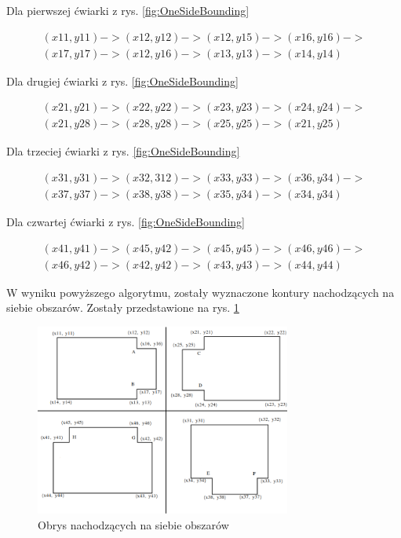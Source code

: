 Dla pierwszej ćwiarki z rys. \ref{fig:OneSideBounding}

\begin{equation}
\begin{split}
(x11, y11) -> (x12, y12) -> (x12, y15) -> (x16, y16) ->  \\
(x17, y17) -> (x12, y16) -> (x13, y13) -> (x14, y14)
\end{split}
\end{equation}

Dla drugiej ćwiarki z rys. \ref{fig:OneSideBounding}

\begin{equation}
\begin{split}
(x21, y21) -> (x22, y22) -> (x23, y23) -> (x24, y24) ->  \\
(x21, y28) -> (x28, y28) -> (x25, y25) -> (x21, y25)
\end{split}
\end{equation}

Dla trzeciej ćwiarki z rys. \ref{fig:OneSideBounding}

\begin{equation}
\begin{split}
(x31, y31) -> (x32, 312) -> (x33, y33) -> (x36, y34) ->  \\
(x37, y37) -> (x38, y38) -> (x35, y34) -> (x34, y34)
\end{split}
\end{equation}

Dla czwartej ćwiarki z rys. \ref{fig:OneSideBounding}

\begin{equation}
\begin{split}
(x41, y41) -> (x45, y42) -> (x45, y45) -> (x46, y46) ->  \\
(x46, y42) -> (x42, y42) -> (x43, y43) -> (x44, y44)
\end{split}
\end{equation}

W wyniku powyższego algorytmu, zostały wyznaczone kontury nachodzących na siebie obszarów. Zostały przedstawione na rys. \ref{fig:OneSideBoundingRemoved}

\begin{figure}[h]
\caption{Obrys nachodzących na siebie obszarów}
\label{fig:OneSideBoundingRemoved}
\centering
\includegraphics[width=0.75\textwidth]{OneSideBoundingRemoved}
\end{figure}

